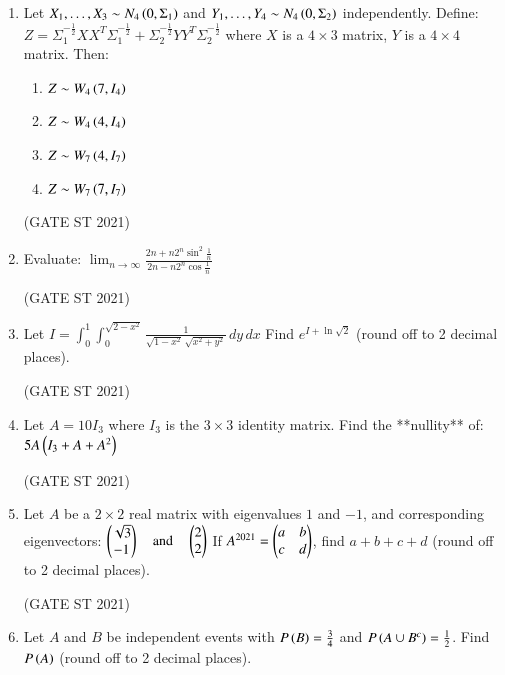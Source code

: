 \documentclass[journal,12pt,onecolumn]{IEEEtran}
\theoremstyle{remark}
\begin{document}
\begin{enumerate}
 

\item
Let $X_1,\dots,X_3 \sim N_4\left(0,\Sigma_1\right)$ and $Y_1,\dots,Y_4 \sim N_4\left(0,\Sigma_2\right)$ independently.  
Define:
$
Z = \Sigma_1^{-\frac12}XX^T\Sigma_1^{-\frac12} + \Sigma_2^{-\frac12}YY^T\Sigma_2^{-\frac12}
$
where $X$ is a $4\times 3$ matrix, $Y$ is a $4\times 4$ matrix.  
Then:
\begin{enumerate}
\item $Z \sim W_4\left(7, I_4\right)$
\item $Z \sim W_4\left(4, I_4\right)$
\item $Z \sim W_7\left(4, I_7\right)$
\item $Z \sim W_7\left(7, I_7\right)$
\end{enumerate}
\hfill (GATE ST 2021) \\


 \item
Evaluate:
$
\lim_{n \to \infty} \frac{2n + n 2^n \sin^2\frac{1}{n}}{2n - n 2^n \cos\frac{1}{n}}
$

\hfill (GATE ST 2021) \\
\item
Let
$
I = \int_{0}^{1} \int_{0}^{\sqrt{2 - x^2}} \frac{1}{\sqrt{1 - x^2} \, \sqrt{x^2 + y^2}} \, dy \, dx
$
Find $e^{I + \ln{\sqrt{2}}}$ (round off to 2 decimal places).

\hfill (GATE ST 2021) \\

\item
Let $A = 10I_3$ where $I_3$ is the $3 \times 3$ identity matrix.  
Find the **nullity** of:
$
5A \left(I_3 + A + A^2\right)
$

\hfill (GATE ST 2021) \\

\item
Let $A$ be a $2 \times 2$ real matrix with eigenvalues $1$ and $-1$, and corresponding eigenvectors:
$
\begin{pmatrix} \sqrt{3} \\ -1 \end{pmatrix}
\quad \text{and} \quad
\begin{pmatrix} 2 \\ 2 \end{pmatrix}
$
If $A^{2021} = \begin{pmatrix} a & b \\ c & d \end{pmatrix}$,  
find $a+b+c+d$ (round off to 2 decimal places).

\hfill (GATE ST 2021) \\

\item
Let $A$ and $B$ be independent events with $P\left(B\right) = \frac{3}{4}$ and $P\left(A \cup B^c\right) = \frac12$.  
Find $P\left(A\right)$ (round off to 2 decimal places).


\end{enumerate}
\end{document}
